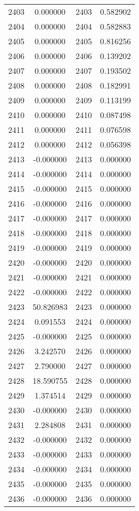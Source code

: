 \documentclass[12pt]{article}
\begin{document}
\begin{longtable}{@{}cccc@{}}
2403 & 0.000000 & 2403 & 0.582902 \\
2404 & 0.000000 & 2404 & 0.582883 \\
2405 & 0.000000 & 2405 & 0.816256 \\
2406 & 0.000000 & 2406 & 0.139202 \\
2407 & 0.000000 & 2407 & 0.193502 \\
2408 & 0.000000 & 2408 & 0.182991 \\
2409 & 0.000000 & 2409 & 0.113199 \\
2410 & 0.000000 & 2410 & 0.087498 \\
2411 & 0.000000 & 2411 & 0.076598 \\
2412 & 0.000000 & 2412 & 0.056398 \\
2413 & -0.000000 & 2413 & 0.000000 \\
2414 & -0.000000 & 2414 & 0.000000 \\
2415 & -0.000000 & 2415 & 0.000000 \\
2416 & -0.000000 & 2416 & 0.000000 \\
2417 & -0.000000 & 2417 & 0.000000 \\
2418 & -0.000000 & 2418 & 0.000000 \\
2419 & -0.000000 & 2419 & 0.000000 \\
2420 & -0.000000 & 2420 & 0.000000 \\
2421 & -0.000000 & 2421 & 0.000000 \\
2422 & -0.000000 & 2422 & 0.000000 \\
2423 & 50.826983 & 2423 & 0.000000 \\
2424 & 0.091553 & 2424 & 0.000000 \\
2425 & -0.000000 & 2425 & 0.000000 \\
2426 & 3.242570 & 2426 & 0.000000 \\
2427 & 2.790000 & 2427 & 0.000000 \\
2428 & 18.590755 & 2428 & 0.000000 \\
2429 & 1.374514 & 2429 & 0.000000 \\
2430 & -0.000000 & 2430 & 0.000000 \\
2431 & 2.284808 & 2431 & 0.000000 \\
2432 & -0.000000 & 2432 & 0.000000 \\
2433 & -0.000000 & 2433 & 0.000000 \\
2434 & -0.000000 & 2434 & 0.000000 \\
2435 & -0.000000 & 2435 & 0.000000 \\
2436 & -0.000000 & 2436 & 0.000000 \\

\end{longtable}
\end{document}
